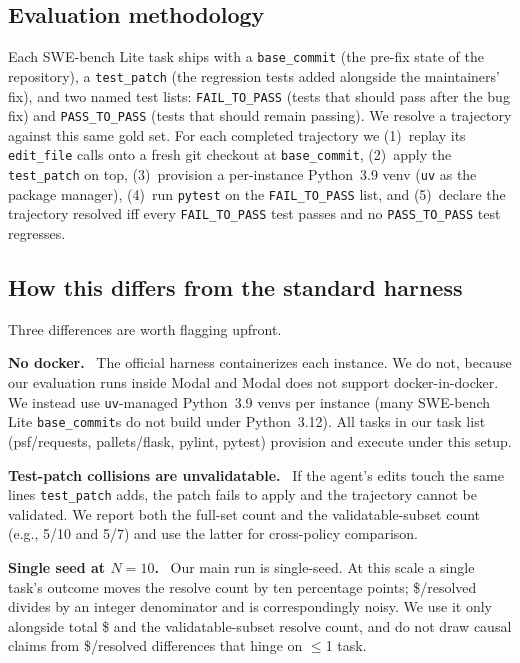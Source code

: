 \documentclass[letterpaper,twocolumn,10pt]{article}
\newcommand{\para}[1]{\smallskip\noindent\textbf{#1.}\ }
\begin{document}
\subsection{Evaluation methodology}
\label{sec:evaluation_method}

Each SWE-bench Lite task ships with a \texttt{base\_commit} (the
pre-fix state of the repository), a \texttt{test\_patch} (the
regression tests added alongside the maintainers' fix), and two
named test lists: \texttt{FAIL\_TO\_PASS} (tests that should pass
after the bug fix) and \texttt{PASS\_TO\_PASS} (tests that should
remain passing). We resolve a trajectory against this same gold
set. For each completed trajectory we (1)~replay its
\texttt{edit\_file} calls onto a fresh git checkout at
\texttt{base\_commit}, (2)~apply the \texttt{test\_patch} on top,
(3)~provision a per-instance Python~3.9 venv (\texttt{uv} as the
package manager), (4)~run \texttt{pytest} on the
\texttt{FAIL\_TO\_PASS} list, and (5)~declare the trajectory
resolved iff every \texttt{FAIL\_TO\_PASS} test passes and no
\texttt{PASS\_TO\_PASS} test regresses.

\subsection{How this differs from the standard harness}
\label{sec:disclosures}

Three differences are worth flagging upfront.

\para{No docker} The official harness containerizes each instance.
We do not, because our evaluation runs inside Modal and Modal does
not support docker-in-docker. We instead use \texttt{uv}-managed
Python~3.9 venvs per instance (many SWE-bench Lite
\texttt{base\_commit}s do not build under Python~3.12). All tasks
in our task list (psf/requests, pallets/flask, pylint, pytest)
provision and execute under this setup.

\para{Test-patch collisions are unvalidatable} If the agent's
edits touch the same lines \texttt{test\_patch} adds, the patch
fails to apply and the trajectory cannot be validated. We report
both the full-set count and the validatable-subset count
(e.g., 5/10 and 5/7) and use the latter for cross-policy
comparison.

\para{Single seed at $N{=}10$} Our main run is single-seed. At
this scale a single task's outcome moves the resolve count by ten
percentage points; \$/resolved divides by an integer denominator
and is correspondingly noisy. We use it only alongside total \$
and the validatable-subset resolve count, and do not draw causal
claims from \$/resolved differences that hinge on $\le$1 task.
\end{document}
